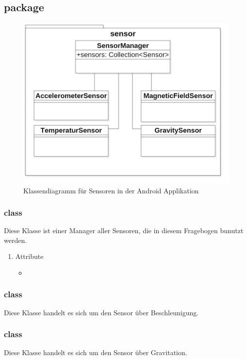 \documentclass[a4paper]{scrreprt}
\begin{document}
            \subsection{package }
            \begin{figure}[H]
                \centering
                \includegraphics[scale = 0.5]{ClassDiagramAppSensor.jpg}
                \caption{Klassendiagramm für Sensoren in der Android Applikation }
            \end{figure}
                \subsubsection{class }
                Diese Klasse ist einer Manager aller Sensoren, die in diesem Fragebogen bunutzt werden.
                \begin{enumerate}
                  \item Attribute
                    \begin{itemize}
                      \item {}
                    \end{itemize}
                \end{enumerate}
                \subsubsection{class }
                Diese Klasse handelt es sich um den Sensor über Beschleunigung.
                \subsubsection{class }
                Diese Klasse handelt es sich um den Sensor über Gravitation.
\end{document}
